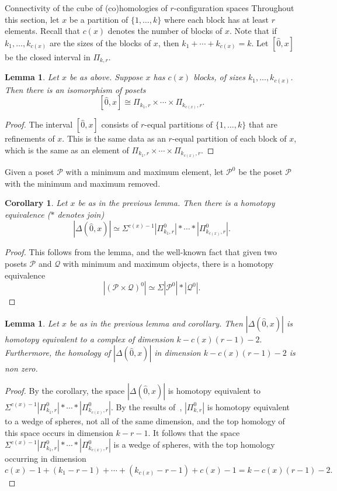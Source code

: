 \documentclass[12pt]{amsart}
\newcommand{\calP}{{\mathcal{P}}}
\newcommand{\calQ}{{\mathcal{Q}}}
\theoremstyle{plain}
\newtheorem{lemma}[thm]{Lemma}
\newtheorem{cor}[thm]{Corollary}
\theoremstyle{definition}
\theoremstyle{remark}
\begin{document}
\begin{section}{Connectivity of the cube of (co)homologies of $r$-configuration spaces}
Throughout this section, let $x$ be a partition of $\{1, \ldots, k\}$ where each block has at least $r$ elements. Recall that $c(x)$ denotes the number of blocks of $x$. Note that if $k_1, \ldots, k_{c(x)}$ are the sizes of the blocks of $x$, then $k_1+\cdots+k_{c(x)}=k$. Let $[\hat 0, x]$ be the closed interval in $\Pi_{k, r}$.
\begin{lemma}
Let $x$ be as above. Suppose $x$ has $c(x)$ blocks, of sizes $k_1, \ldots, k_{c(x)}$. Then there is an isomorphism of posets
\[
[\hat 0, x]\cong \Pi_{k_1, r}\times \cdots\times \Pi_{k_{c(x)}, r}.
\]
\end{lemma}
\begin{proof}
The interval $[\hat 0, x]$ consists of $r$-equal partitions of $\{1, \ldots, k\}$ that are refinements of $x$. This is the same data as an $r$-equal partition of each block of $x$, which is the same as an element of $\Pi_{k_1, r}\times \cdots\times \Pi_{k_{c(x)}, r}$.
\end{proof}
Given a poset $\calP$ with a minimum and maximum element, let $\calP^0$ be the poset $\calP$ with the minimum and maximum removed.
\begin{cor}
Let $x$ be as in the previous lemma. Then there is a homotopy equivalence ($*$ denotes join)
\[
|\Delta(\hat 0, x)|\simeq \Sigma^{c(x)-1} |\Pi_{k_1, r}^0| *\cdots* |\Pi_{k_{c(x)}, r}^0|.
\]
\end{cor}
\begin{proof}
This follows from the lemma, and the well-known fact that given two posets $\calP$ and $\calQ$ with minimum and maximum objects, there is a homotopy equivalence~\cite[Theorem 5.1 (d)]{Walker:Posets} 
$$|(\calP \times \calQ)^0| \simeq \Sigma |\calP^0|*|\calQ^0|.$$
\end{proof}

\begin{lemma}\label{L:dimensionofcomplex}
Let $x$ be as in the previous lemma and corollary. Then $|\Delta(\hat{0},x)|$ is homotopy equivalent to a complex of dimension $k-c(x)(r-1)-2.$
Furthermore, the homology of $|\Delta(\hat{0},x)|$ in dimension $k-c(x)(r-1)-2$ is non zero.
\end{lemma}
\begin{proof}
By the corollary, the space $|\Delta(\hat{0},x)|$ is homotopy equivalent to $\Sigma^{c(x)-1} |\Pi_{k_1, r}^0| *\cdots* |\Pi_{k_{c(x)}, r}^0|$. By the results of~\cite{Bjo95}, $|\Pi_{k, r}^0|$ is homotopy equivalent to a wedge of spheres, not all of the same dimension, and the top homology of this space occurs in dimension $k-r-1$. It follows that the space $\Sigma^{c(x)-1} |\Pi_{k_1, r}^0| *\cdots* |\Pi_{k_{c(x)}, r}^0|$ is a wedge of spheres, with the top homology occurring in dimension $$c(x)-1 + (k_1-r-1)+\cdots+(k_{c(x)}-r-1) + c(x)-1= k - c(x)(r-1)-2.$$
\end{proof}



\end{section}
\end{document}

